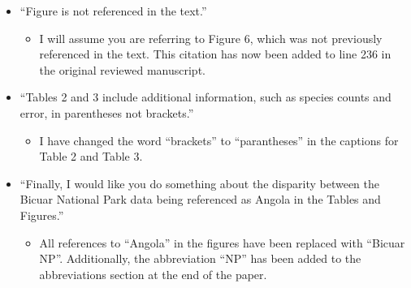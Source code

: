 \documentclass[a4paper]{letter}
\begin{document}
\begin{letter}{}
\begin{itemize}
\begin{itemize}
		\end{itemize}
	\item{``Figure is not referenced in the text.''}
		\begin{itemize}
			\item{I will assume you are referring to Figure 6, which was not previously referenced in the text. This citation has now been added to line 236 in the original reviewed manuscript.}
		\end{itemize}
	\item{``Tables 2 and 3 include additional information, such as species counts and error, in parentheses not brackets.''}
		\begin{itemize}
			\item{I have changed the word ``brackets'' to ``parantheses'' in the captions for Table 2 and Table 3.}
		\end{itemize}
	\item{``Finally, I would like you do something about the disparity between the Bicuar National Park data being referenced as Angola in the Tables and Figures.''}
		\begin{itemize}
			\item{All references to ``Angola'' in the figures have been replaced with ``Bicuar NP''. Additionally, the abbreviation ``NP'' has been added to the abbreviations section at the end of the paper.}
		\end{itemize}
\end{itemize}




\end{letter}
 
\end{document}
